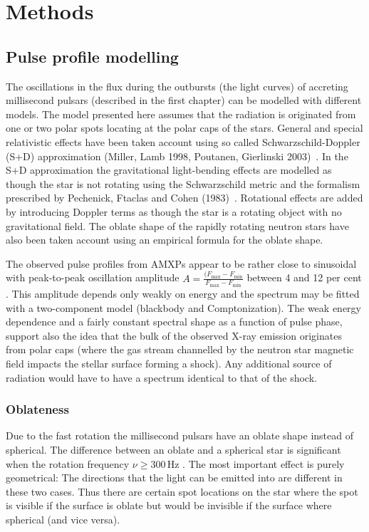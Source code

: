 \documentclass{wihuri}
\begin{document}
\fi

\section{Methods}

\subsection{Pulse profile modelling}

The oscillations in the flux during the outbursts (the light curves) of accreting millisecond pulsars (described in the first chapter) can be modelled with different models. The model presented here assumes that the radiation is originated from one or two polar spots locating at the polar caps of the stars. General and special relativistic effects have been taken account using so called Schwarzschild-Doppler (S+D) approximation (Miller, Lamb 1998, Poutanen, Gierlinski 2003)~\cite{poutagierlinskisax}. In the S+D approximation the gravitational light-bending effects are modelled as though the star is not rotating using the Schwarzschild metric and the formalism prescribed by
Pechenick, Ftaclas and Cohen (1983)~\cite{pechenick}. 
Rotational effects are added by introducing Doppler terms as though the star is a rotating object with no gravitational field. The oblate shape of the rapidly rotating neutron stars have also been taken account using an empirical formula for the oblate shape.

The observed pulse profiles from AMXPs appear to be rather close to sinusoidal with peak-to-peak oscillation amplitude $A = \frac{(F_{\mathrm{max}} - F_{\mathrm{min}}} {F_{\mathrm{max}} - F_{\mathrm{min}}}$ between 4 and 12 per cent \cite{poutarew2006}. This amplitude depends only weakly on energy and the spectrum may be fitted with a two-component model (blackbody and Comptonization). The weak energy dependence and a fairly constant spectral shape as a function of pulse phase, support also the idea that the bulk of the observed X-ray emission originates from polar caps (where the gas stream channelled by the neutron star magnetic field impacts the stellar surface forming a shock). Any additional source of radiation would have to have a spectrum identical to that of the shock.


\subsubsection{Oblateness}

Due to the fast rotation the millisecond pulsars have an oblate shape instead of spherical. The difference between an oblate and a spherical star is significant when the rotation frequency $\nu \ge 300 \, \mathrm{Hz}$ %
. The most important effect is purely geometrical: The directions that the light can be emitted into are different in these two cases. Thus there are certain spot locations on the star where the spot is visible if the surface is oblate but would be invisible if the surface where spherical (and vice versa).
\end{document}
